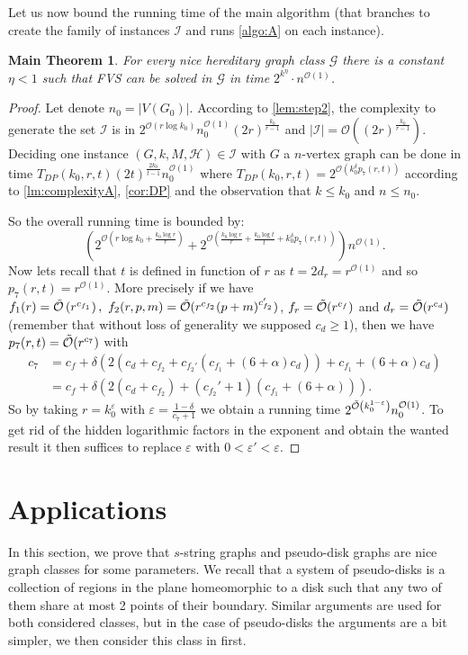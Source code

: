 \documentclass{amsart}
\newtheorem*{main-thm}{Main Theorem}
\newcommand{\I}{\mathcal{I}}
\newcommand{\eps}{\varepsilon}
\newcommand{\mH}{\mathcal{H}}
\newcommand{\tdp}{T_{DP}}
\DeclareMathOperator\TO{\Tilde{\O}}
\renewcommand{\O}{\mathcal{O}}
\begin{document}
Let us now bound the running time of the main algorithm (that branches to create the family of instances $\I$ and runs \autoref{algo:A} on each instance).
\begin{main-thm}
For every nice hereditary graph class $\mathcal{G}$ there is a constant $\eta<1$ such that FVS can be solved in $\mathcal{G}$ in time $2^{k^\eta}\cdot  n^{\O(1)}$.

\end{main-thm}
\begin{proof}
Let denote $n_0=|V(G_0)|$.
According to \autoref{lem:step2}, the complexity to generate the set $\I$ is in $2^{\O\left (r\log k_0 \right )}n_0^{\O(1)}(2r)^{\frac{k_0}{r-1}}$ and $|\I|=\O\left((2r)^{\frac{k_0}{r-1}}\right)$.
Deciding one instance $(G,k,M,\mH)\in \I$ with $G$ a $n$-vertex graph can be done in time $\tdp(k_0,r,t)(2t)^{\frac{2k_0}{t-1}}n_0^{\O(1)}$
where $\tdp(k_0,r,t)=2^{\O\left(k_0^{\delta}p_7(r,t)\right)}$ according to \autoref{lm:complexityA}, \autoref{cor:DP} and the observation that $k\leq k_0$ and $n\leq n_0$. 

So the overall running time is bounded by:
$$\left(2^{\O\left(r\log k_0+\frac{k_0\log r}{r}\right)}+2^{\O\left(\frac{k_0\log r}{r}+\frac{k_0\log t}{t}+k_0^{\delta}p_7(r,t) \right)} \right)n^{\O(1)}.$$
Now lets recall that $t$ is defined in function of $r$ as $t=2d_r=r^{\O(1)}$ and so $p_7(r,t)=r^{\O(1)}$. 
More precisely if we have 
$f_1(r)=\TO\left(r^{c_{f_1}}\right),~f_2(r,p,m)=\TO(r^{c_{f_2}}(p+m)^{c_{f_2}'})$, $f_r=\TO(r^{c_f})$ and $d_r=\TO(r^{c_d})$ (remember that without loss of generality we supposed $c_d\geq 1$), then we have $p_7(r,t)=\TO(r^{c_7})$ with
\begin{align*}
    c_7&=c_f+\delta(2(c_d+c_{f_2}+c_{f_2'}(c_{f_1}+(6+\alpha)c_d))+c_{f_1}+(6+\alpha)c_d)\\
    &=c_f+\delta(2(c_d+c_{f_2})+(c_{f_2}'+1)(c_{f_1}+(6+\alpha))).
\end{align*}
So by taking $r=k_0^{\eps}$ with $\eps=\frac{1-\delta}{c_7+1}$ we obtain a running time  $2^{\TO\left(k_0^{1-\eps}\right)}n_0^{\O(1)}$. 
To get rid of the hidden logarithmic factors in the exponent and obtain the wanted result it then suffices to replace $\eps$ with $0<\eps'<\eps$.
\end{proof}



\section{Applications}\label{sec:applications}
In this section, we prove that $s$-string graphs and pseudo-disk graphs are nice graph classes for some parameters. We recall that a system of pseudo-disks is a collection of regions in the plane homeomorphic to a disk such that any two of them share at most 2 points of their boundary.
Similar arguments are used for both considered classes, but in the case of pseudo-disks the arguments are a bit simpler, we then consider this class in first.
\end{document}
